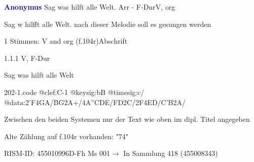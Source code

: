 \documentclass[twocolumn]{book}
\begin{document}
\par \vspace{7pt} \textcolor{darkblue}{\textbf{Anonymus  }}\hfillplus{\textbf{[202]}}\newline Sag was hilft alle Welt. Arr - F-Dur\newline V, org
\par \begin{itshape} Sag w hilfft alle Welt. nach dieser Melodie soll es gesungen werden\end{itshape} 
\par \textcolor{darkblue}{}  1 Stimmen: V and org  (f.104r)\newline Abschrift
\par 1.1.1  V, F-Dur\newline \begin{footnotesize} Sag was hilft alle Welt \end{footnotesize}  
\begin{filecontents*}{202-1.code}
@clef:C-1
@keysig:bB
@timesig:c/
@data:2'F4GA/BG2A+/4A''CDE/FD2C/2F4ED/C'B2A/
\end{filecontents*}
\newline
%
\par Zwischen den beiden Systemen nur der Text wie oben im dipl. Titel angegeben
\par Alte Zählung auf f.104r vorhanden: "74"
\par RISM-ID: 455010996\newline D-Fh  Ms 001\newline $\rightarrow$ In Sammlung 418 (455008343)
      
\end{document}

